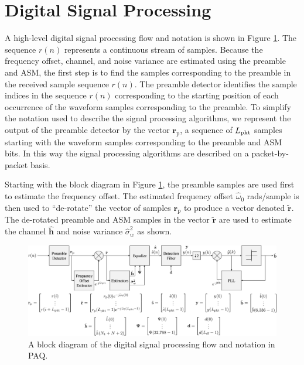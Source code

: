 \section{Digital Signal Processing}
\label{sec:signalProcessing}
A high-level digital signal processing flow and notation is shown in Figure \ref{fig:fullSystem}.
The sequence $r(n)$ represents a continuous stream of samples.
Because the frequency offset, channel, and noise variance are estimated using the preamble and ASM, the first step is to find the samples corresponding to the preamble in the received sample sequence $r(n)$.
The preamble detector identifies the sample indices in the sequence $r(n)$ corresponding to the starting position of each occurrence of the waveform samples corresponding to the preamble.
To simplify the notation used to describe the signal processing algorithms, we represent the output of the preamble detector by the vector $\mathbf{r}_\text{p}$, a sequence of $L_\text{pkt}$ samples starting with the waveform samples corresponding to the preamble and ASM bits.
In this way the signal processing algorithms are described on a packet-by-packet basis.

Starting with the block diagram in Figure \ref{fig:fullSystem}, the preamble samples are used first to estimate the frequency offset.
The estimated frequency offset $\hat{\omega}_0$ rads/sample is then used to ``de-rotate'' the vector of samples $\mathbf{r}_\text{p}$ to produce a vector denoted $\tilde{\mathbf{r}}$.
The de-rotated preamble and ASM samples in the vector $\tilde{\mathbf{r}}$ are used to estimate the channel $\hat{\mathbf{h}}$ and noise variance $\hat{\sigma}^2_w$ as shown.
\begin{figure}
	\includegraphics[width=15.72in/100*55]{figures/eq_equations/fullSystem.pdf}
	\caption{A block diagram of the digital signal processing flow and notation in PAQ.}
	\label{fig:fullSystem}
\end{figure}

